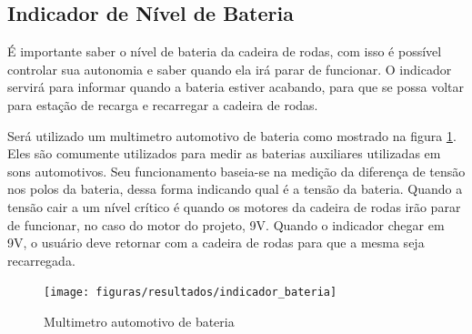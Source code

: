 \subsection{Indicador de Nível de Bateria}

É importante saber o nível de bateria da cadeira de rodas, com isso é possível controlar sua autonomia e saber quando ela irá parar de funcionar. O indicador servirá para informar quando a bateria estiver acabando, para que se possa voltar para estação de recarga e recarregar a cadeira de rodas.

Será utilizado um multimetro automotivo de bateria como mostrado na figura \ref{fig:indicador_bateria}. Eles são comumente utilizados para medir as baterias auxiliares utilizadas em sons automotivos. Seu funcionamento baseia-se na medição da diferença de tensão nos polos da bateria, dessa forma indicando qual é a tensão da bateria. Quando a tensão cair a um nível crítico é quando os motores da cadeira de rodas irão parar de funcionar, no caso do motor do projeto, 9V. Quando o indicador chegar em 9V, o usuário deve retornar com a cadeira de rodas para que a mesma seja recarregada.

\begin{figure}[!ht]
  \center
  \texttt{[image: figuras/resultados/indicador\_bateria]}
  \caption{Multimetro automotivo de bateria}
  \label{fig:indicador_bateria}
\end{figure}
